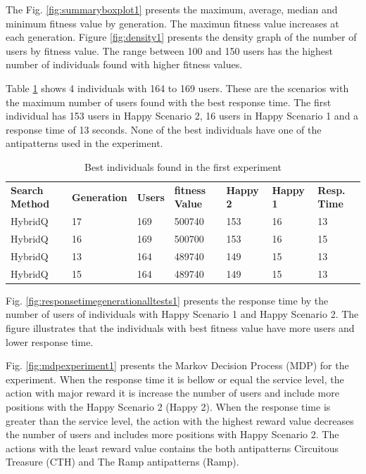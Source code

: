 \documentclass{bmcart}
\begin{document}
The Fig. \ref{fig:summaryboxplot1} presents the maximum, average, median and minimum fitness value by generation. The maximun fitness value increases at each generation. Figure \ref{fig:density1} presents the density graph of the number of users by fitness value. The range between 100 and 150 users has the highest number of individuals found with higher fitness values.


Table \ref{tab:bestindividuals} shows 4 individuals with 164 to 169 users. These are the scenarios with the maximum number of users found with the best response time. The first individual has 153 users in Happy Scenario 2, 16 users in Happy Scenario 1 and a response time of 13 seconds. None of the best individuals have one of the antipatterns used in the experiment.



\begin{table}[h]
\centering
\caption{Best individuals found in the first experiment}
\label{tab:bestindividuals}
\begin{tabular}{lllllll}
\rowcolor[HTML]{C0C0C0} 
\textbf{Search Method} & \textbf{Generation} & \textbf{Users} & \textbf{fitness Value} & \textbf{Happy 2} & \textbf{Happy 1} & \textbf{Resp. Time} \\
HybridQ & 17 & 169 & 500740 & 153 & 16 & 13 \\
HybridQ & 16 & 169 & 500700 & 153 & 16 & 15 \\
HybridQ & 13 & 164 & 489740 & 149 & 15 & 13 \\
HybridQ & 15 & 164 & 489740 & 149 & 15 & 13
\end{tabular}
\end{table}

Fig. \ref{fig:responsetimegenerationalltests1} presents the response time by the number of users of individuals with Happy Scenario 1 and Happy Scenario 2. The figure illustrates that the individuals with best fitness value have more users and lower response time. 


Fig. \ref{fig:mdpexperiment1} presents the Markov Decision Process (MDP) for the experiment. When the response time it is bellow or equal the service level, the action with major reward it is increase the number of users and include more positions with the Happy Scenario 2 (Happy 2). When the response time is greater than the service level, the action with the highest reward value decreases the number of users and includes more positions with Happy Scenario 2. The actions with the least reward value contains the both antipatterns Circuitous Treasure (CTH) and The Ramp antipatterns (Ramp).
\end{document}
